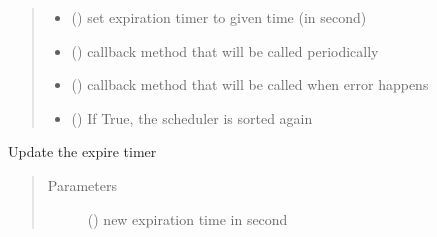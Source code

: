 \documentclass[letterpaper,10pt,english]{sphinxmanual}
\begin{document}
\begin{fulllineitems}
\begin{fulllineitems}
\begin{quote}
\begin{description}
\begin{itemize}
\item {} 
 () \textendash{} set expiration timer to given time (in second)

\item {} 
 () \textendash{} callback method that will be called periodically

\item {} 
 () \textendash{} callback method that will be called when error happens

\item {} 
 () \textendash{} If True, the scheduler is sorted again

\end{itemize}

\end{description}\end{quote}

\end{fulllineitems}


\begin{fulllineitems}
\label{\detokenize{bbc1.core.query_management:bbc1.core.query_management.QueryEntry.update_expiration_time}}
Update the expire timer
\begin{quote}\begin{description}
\item[{Parameters}] \leavevmode
{} () \textendash{} new expiration time in second

\end{description}\end{quote}

\end{fulllineitems}


\end{fulllineitems}

\end{document}
